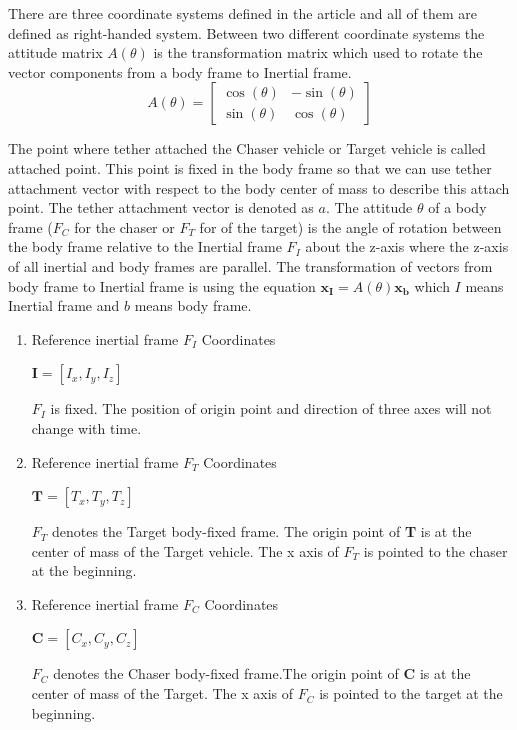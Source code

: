There are three coordinate systems defined in the article and all of them are defined as right-handed system. Between two different coordinate systems the attitude matrix $A(\theta)$ is the transformation matrix which used to rotate the vector components from a body frame to Inertial frame. 
\begin{equation}
A(\theta) =
	\begin{bmatrix}
	\cos(\theta) & -\sin(\theta) \\
	\sin(\theta) & \cos(\theta)
	\end{bmatrix}
\end{equation}

	The point where tether attached the Chaser vehicle or Target vehicle is called attached point. This point is fixed in the body frame so that we can use tether attachment vector with respect to the body center of mass to describe this attach point. The tether attachment vector is denoted as $a$.
The attitude $\theta$  of a body frame ($F_C$ for the chaser or $F_T$ for of the target) is the angle of rotation between the body frame relative to the Inertial frame $F_I$ about the z-axis where the z-axis of all inertial and body frames are parallel. The transformation of vectors from body frame to Inertial frame is using the equation  $\mathbf{x_I}=A(\theta)\mathbf{x_b}$ which $I$ means Inertial frame and $b$ means body frame.
\boldmath
\begin{enumerate}

\item Reference inertial frame $F_I$ Coordinates\\		
\begin{center} $\textbf{I} =[I_x, I_y, I_z]$ \end{center}
\textbf {$F_I$} is fixed. The position of origin point and direction of three axes will not change with time.    


\item Reference inertial frame $F_T$ Coordinates\\		
\begin{center} $\textbf{T} =[T_x, T_y, T_z]$ \end{center}
\textbf{$F_T$} denotes the Target body-fixed frame. The origin point of \textbf{T} is at the center of mass of the Target vehicle. The x axis of $F_T$ is pointed to the chaser at the beginning. 

\item Reference inertial frame $F_C$ Coordinates\\		
\begin{center} $\textbf{C} =[C_x, C_y, C_z]$ \end{center}
\textbf{$F_C$} denotes the Chaser body-fixed frame.The origin point of \textbf{C} is at the center of mass of the Target. The x axis of $F_C$ is pointed to the target at the beginning. 
\end{enumerate}
\unboldmath

